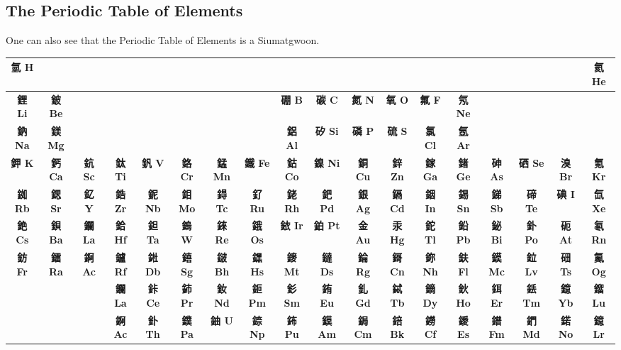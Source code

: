\subsection{The Periodic Table of Elements}

One can also see that the Periodic Table of Elements is a Siumatgwoon. 
\begin{center}
    \renewcommand{\arraystretch}{1.2}
    \setlength{\tabcolsep}{4pt}
    \begin{tabular}{|c|c|c|c|c|c|c|c|c|c|c|c|c|c|c|c|c|c|}
    \hline
    \textbf{氫 H} &  &  &  &  &  &  &  &  &  &  &  &  &  &  &  &  & \textbf{氦 He} \\
    \hline
    \textbf{鋰 Li} & \textbf{鈹 Be} &  &  &  &  &  &  & \textbf{硼 B} & \textbf{碳 C} & \textbf{氮 N} & \textbf{氧 O} & \textbf{氟 F} & \textbf{氖 Ne} &  &  &  & \\
    \hline
    \textbf{鈉 Na} & \textbf{鎂 Mg} &  &  &  &  &  &  & \textbf{鋁 Al} & \textbf{矽 Si} & \textbf{磷 P} & \textbf{硫 S} & \textbf{氯 Cl} & \textbf{氬 Ar} &  &  &  & \\
    \hline
    \textbf{鉀 K} & \textbf{鈣 Ca} & \textbf{鈧 Sc} & \textbf{鈦 Ti} & \textbf{釩 V} & \textbf{鉻 Cr} & \textbf{錳 Mn} & \textbf{鐵 Fe} & \textbf{鈷 Co} & \textbf{鎳 Ni} & \textbf{銅 Cu} & \textbf{鋅 Zn} & \textbf{鎵 Ga} & \textbf{鍺 Ge} & \textbf{砷 As} & \textbf{硒 Se} & \textbf{溴 Br} & \textbf{氪 Kr} \\
    \hline
    \textbf{銣 Rb} & \textbf{鍶 Sr} & \textbf{釔 Y} & \textbf{鋯 Zr} & \textbf{鈮 Nb} & \textbf{鉬 Mo} & \textbf{鍀 Tc} & \textbf{釕 Ru} & \textbf{銠 Rh} & \textbf{鈀 Pd} & \textbf{銀 Ag} & \textbf{鎘 Cd} & \textbf{銦 In} & \textbf{錫 Sn} & \textbf{銻 Sb} & \textbf{碲 Te} & \textbf{碘 I} & \textbf{氙 Xe} \\
    \hline
    \textbf{銫 Cs} & \textbf{鋇 Ba} & \textbf{鑭 La} & \textbf{鉿 Hf} & \textbf{鉭 Ta} & \textbf{鎢 W} & \textbf{錸 Re} & \textbf{鋨 Os} & \textbf{銥 Ir} & \textbf{鉑 Pt} & \textbf{金 Au} & \textbf{汞 Hg} & \textbf{鉈 Tl} & \textbf{鉛 Pb} & \textbf{鉍 Bi} & \textbf{釙 Po} & \textbf{砈 At} & \textbf{氡 Rn} \\
    \hline
    \textbf{鈁 Fr} & \textbf{鐳 Ra} & \textbf{錒 Ac} & \textbf{鑪 Rf} & \textbf{𨧀 Db} & \textbf{𨭎 Sg} & \textbf{𨨏 Bh} & \textbf{𨭆 Hs} & \textbf{䥑 Mt} & \textbf{鐽 Ds} & \textbf{錀 Rg} & \textbf{鎶 Cn} & \textbf{鉨 Nh} & \textbf{鈇 Fl} & \textbf{鏌 Mc} & \textbf{鉝 Lv} & \textbf{鿬 Ts} & \textbf{鿫 Og} \\
    \hline
    \multicolumn{3}{|c|}{} & \textbf{鑭 La} & \textbf{鉲 Ce} & \textbf{鈰 Pr} & \textbf{釹 Nd} & \textbf{鉕 Pm} & \textbf{釤 Sm} & \textbf{銪 Eu} & \textbf{釓 Gd} & \textbf{鋱 Tb} & \textbf{鏑 Dy} & \textbf{鈥 Ho} & \textbf{鉺 Er} & \textbf{銩 Tm} & \textbf{鐿 Yb} & \textbf{鎦 Lu} \\
    \hline
    \multicolumn{3}{|c|}{} & \textbf{錒 Ac} & \textbf{釙 Th} & \textbf{鏷 Pa} & \textbf{鈾 U} & \textbf{錼 Np} & \textbf{鈽 Pu} & \textbf{鏌 Am} & \textbf{鋦 Cm} & \textbf{錇 Bk} & \textbf{鐒 Cf} & \textbf{鑀 Es} & \textbf{鐠 Fm} & \textbf{鍆 Md} & \textbf{鍩 No} & \textbf{鐿 Lr} \\
    \hline
    \end{tabular}
\end{center}


